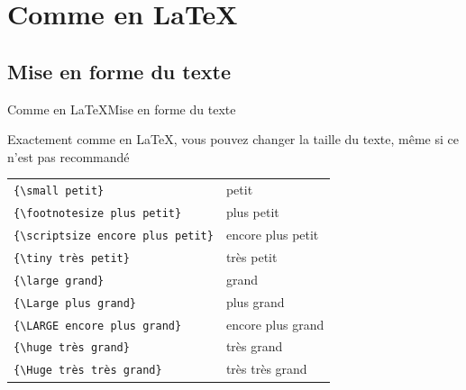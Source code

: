 \documentclass[french]{beamer}
\begin{document}
  \section{Comme en \LaTeX}
  \subsection{Mise en forme du texte}

  \begin{frame}[fragile]{Comme en \LaTeX}{Mise en forme du texte}
    \begin{block}{}
      Exactement comme en \LaTeX, vous pouvez changer la taille du texte, même si ce n'est pas recommandé
      \newsavebox\tailletexte
      \begin{lrbox}{\tailletexte}
      \begin{minipage}{\textwidth}
        \begin{tabular}{ll}
          \verb|{\small petit}| & {\small petit}\\
          \verb|{\footnotesize plus petit}| & {\footnotesize plus petit}\\
          \verb|{\scriptsize encore plus petit}| & {\scriptsize encore plus petit}\\
          \verb|{\tiny très petit}| & {\tiny très petit}\\
          \verb|{\large grand}| & {\large grand}\\
          \verb|{\Large plus grand}| & {\Large plus grand}\\
          \verb|{\LARGE encore plus grand}| & {\LARGE encore plus grand}\\
          \verb|{\huge très grand}| & {\huge très grand}\\
          \verb|{\Huge très très grand}| & {\Huge très très grand}
        \end{tabular}
      \end{minipage}
      \end{lrbox}
      \resizebox{0.9\textwidth}{!}{\usebox\tailletexte}
    \end{block}
  \end{frame}
\end{document}
